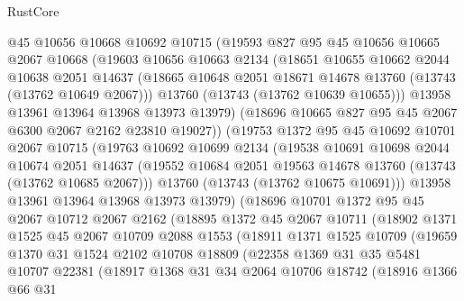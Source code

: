 \begin{lexlean}{RustCore}
\begin{coremodule}
        @45
        @10656
        @10668
        @10692
        @10715
        (@19593
          @827
          @95
          @45
          @10656
          @10665
          @2067
          @10668
          (@19603
            @10656
            @10663
            @2134
            (@18651
              @10655
              @10662
              @2044
              @10638
              @2051
              @14637
              (@18665 @10648 @2051 @18671 @14678 @13760 (@13743 (@13762 @10649 @2067)))
              @13760
              (@13743 (@13762 @10639 @10655)))
            @13958
            @13961
            @13964
            @13968
            @13973
            @13979)
          (@18696 @10665 @827 @95 @45 @2067 @6300 @2067 @2162 @23810 @19027))
        (@19753
          @1372
          @95
          @45
          @10692
          @10701
          @2067
          @10715
          (@19763
            @10692
            @10699
            @2134
            (@19538
              @10691
              @10698
              @2044
              @10674
              @2051
              @14637
              (@19552 @10684 @2051 @19563 @14678 @13760 (@13743 (@13762 @10685 @2067)))
              @13760
              (@13743 (@13762 @10675 @10691)))
            @13958
            @13961
            @13964
            @13968
            @13973
            @13979)
          (@18696
            @10701
            @1372
            @95
            @45
            @2067
            @10712
            @2067
            @2162
            (@18895
              @1372
              @45
              @2067
              @10711
              (@18902
                @1371
                @1525
                @45
                @2067
                @10709
                @2088
                @1553
                (@18911
                  @1371
                  @1525
                  @10709
                  (@19659
                    @1370
                    @31
                    @1524
                    @2102
                    @10708
                    @18809
                    (@22358
                      @1369
                      @31
                      @35
                      @5481
                      @10707
                      @22381
                      (@18917
                        @1368
                        @31
                        @34
                        @2064
                        @10706
                        @18742
                        (@18916
                          @1366
                          @66
                          @31

\end{coremodule}
\end{lexlean}

